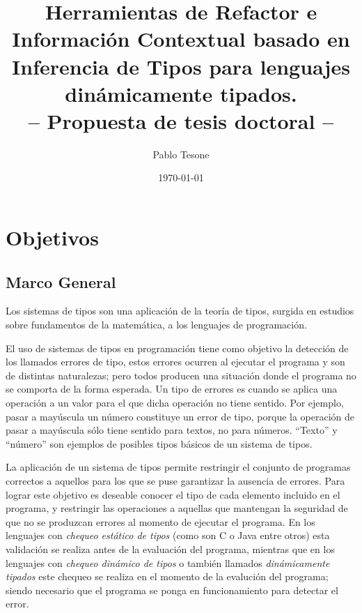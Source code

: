\documentclass[a4paper,10pt]{article}
\title{Herramientas de Refactor e Información Contextual basado en Inferencia de Tipos para lenguajes dinámicamente tipados.\\
-- Propuesta de tesis doctoral -- }
\author{Pablo Tesone}
\date{\today}
\begin{document}
\maketitle

\section{Objetivos}
\subsection{Marco General}

Los sistemas de tipos\cite{Pier02a} son una aplicación de la teoría de tipos\cite{Pier02a}, surgida en estudios sobre fundamentos de la matemática, a los lenguajes de programación. 

El uso de sistemas de tipos en programación tiene como objetivo la detección de los llamados errores de tipo\cite{Miln78a}, estos errores ocurren al ejecutar el programa y son de distintas naturalezas; pero todos producen una situación donde el programa no se comporta de la forma esperada. Un tipo de errores es cuando se aplica una operación a un valor para el que dicha operación no tiene sentido. Por ejemplo, pasar a mayúscula un número constituye un error de tipo, porque la operación de pasar a mayúscula sólo tiene sentido para textos, no para números.  
``Texto'' y ``número'' son ejemplos de posibles tipos básicos de un sistema de tipos.


La aplicación de un sistema de tipos permite restringir el conjunto de programas correctos a aquellos para los que se puse garantizar la ausencia de errores. Para lograr este objetivo es deseable conocer el tipo de cada elemento incluido en el programa, y restringir las operaciones a aquellas que mantengan la seguridad de que no se produzcan errores al momento de ejecutar el programa. En los lenguajes con \emph{chequeo estático de tipos} (como son C o Java entre otros) esta validación se realiza antes de la evaluación del programa, mientras que en los lenguajes con \emph{chequeo dinámico de tipos} o también llamados \emph{dinámicamente tipados}\cite{Pier02a,Card85c} este chequeo se realiza en el momento de la evalución del programa; siendo necesario que el programa se ponga en funcionamiento para detectar el error. 
\end{document}
